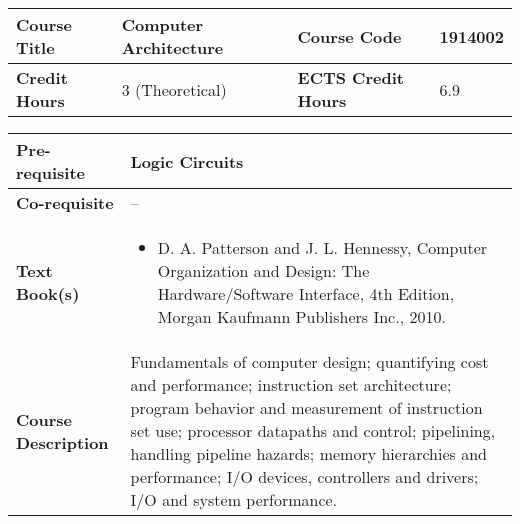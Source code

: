 \documentclass[12pt]{article}
\begin{document}
\bigskip
\bigskip




\begin{minipage}{\textwidth}
\begin{tabularx}{\textwidth}{|l|X|l|X|}
\hline
\textbf{Course Title}       &  Computer Architecture & \textbf{Course Code}       &   1914002\\ \hline
\textbf{Credit Hours}       &  3 (Theoretical) & \textbf{ECTS Credit Hours}       & 6.9  \\ \hline
\end{tabularx}

\begin{tabularx}{\textwidth}{|l|X|}
\hline
\textbf{Pre-requisite}      &  Logic Circuits \\ \hline
\textbf{Co-requisite}       &  -- \\ \hline
\textbf{Text Book(s)}      & \begin{minipage}{.70\textwidth}
					\begin{itemize} \itemsep-0.4em
						\vspace{3mm}
						\item D. A. Patterson and J. L. Hennessy, Computer Organization and Design: The Hardware/Software Interface, 4th Edition, Morgan Kaufmann Publishers Inc., 2010.
						\vspace{3mm}
					\end{itemize}
				\end{minipage}  \\ \hline
\textbf{Course Description} & \begin{minipage}{.70\textwidth}
					\vspace{3mm}
					Fundamentals of computer design; quantifying cost and performance; instruction set architecture; program behavior and measurement of instruction set use;
					 processor datapaths and control; pipelining, handling pipeline hazards; memory hierarchies and performance;
					 I/O devices, controllers and drivers; I/O and system performance.

					\vspace{3mm}
					\end{minipage} \\ \hline
\end{tabularx}
\end{minipage}


\bigskip
\bigskip
\end{document}
